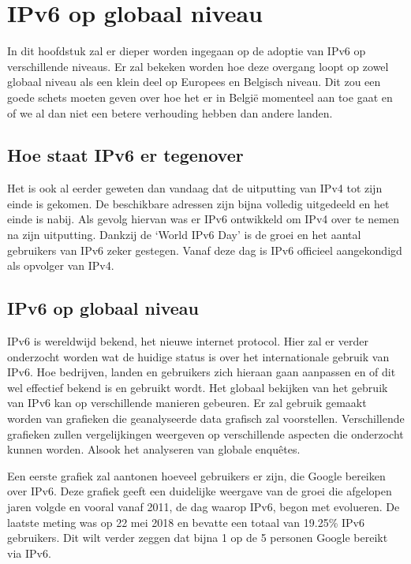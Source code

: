 
\chapter{IPv6 op globaal niveau}
\label{ch:h5}

In dit hoofdstuk zal er dieper worden ingegaan op de adoptie van IPv6 op verschillende niveaus. Er zal bekeken worden hoe deze overgang loopt op zowel globaal niveau als een klein deel op Europees en Belgisch niveau. Dit zou een goede schets moeten geven over hoe het er in België momenteel aan toe gaat en of we al dan niet een betere verhouding hebben dan andere landen. 

\section{Hoe staat IPv6 er tegenover}

Het is ook al eerder geweten dan vandaag dat de uitputting van IPv4 tot zijn einde is gekomen. De beschikbare adressen zijn bijna volledig uitgedeeld en het einde is nabij. Als gevolg hiervan was er IPv6 ontwikkeld om IPv4 over te nemen na zijn uitputting. Dankzij de ‘World IPv6 Day’ is de groei en het aantal gebruikers van IPv6 zeker gestegen. Vanaf deze dag is IPv6 officieel aangekondigd als opvolger van IPv4. 

\section{IPv6 op globaal niveau}

IPv6 is wereldwijd bekend, het nieuwe internet protocol. Hier zal er verder onderzocht worden wat de huidige status is over het internationale gebruik van IPv6. Hoe bedrijven, landen en gebruikers zich hieraan gaan aanpassen en of dit wel effectief bekend is en gebruikt wordt. Het globaal bekijken van het gebruik van IPv6 kan op verschillende manieren gebeuren. Er zal gebruik gemaakt worden van grafieken die geanalyseerde data grafisch zal voorstellen. Verschillende grafieken zullen vergelijkingen weergeven op verschillende aspecten die onderzocht kunnen worden. Alsook het analyseren van globale enquêtes. 

Een eerste grafiek zal aantonen hoeveel gebruikers er zijn, die Google bereiken over IPv6. Deze grafiek geeft een duidelijke weergave van de groei die afgelopen jaren volgde en vooral vanaf 2011, de dag waarop IPv6, begon met evolueren. De laatste meting was op 22 mei 2018 en bevatte een totaal van 19.25\% IPv6 gebruikers. Dit wilt verder zeggen dat bijna 1 op de 5 personen Google bereikt via IPv6. 

